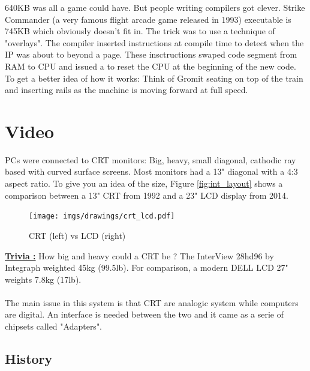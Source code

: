 \documentclass[book.tex]{subfiles}
\begin{document}
\par
{} 640KB was all a game could have. But people writing compilers got clever. Strike Commander (a very famous flight arcade game released in 1993) executable is 745KB which obviously doesn't fit in. The trick was to use a technique of "overlays". The compiler inserted instructions at compile time to detect when the IP was about to beyond a page. These insctructions swaped code segment from RAM to CPU and issued a  to reset the CPU at the beginning of the new code. To get a better idea of how it works: Think of Gromit seating on top of the train and inserting rails as the machine is moving forward at full speed.

















\section{Video}

PCs were connected to CRT monitors: Big, heavy, small diagonal, cathodic ray based with curved surface screens. Most monitors had a 13" diagonal with a 4:3 aspect ratio. To give you an idea of the size, Figure \ref{fig:int_layout} shows a comparison between a 13" CRT from 1992 and a 23" LCD display from 2014.\\

\begin{figure}[H]
\centering
\texttt{[image: imgs/drawings/crt\_lcd.pdf]}
\caption{CRT (left) vs LCD (right)}
\label{fig:lcd_vs_crt}
\end{figure}

\textbf{\underline{Trivia :}} How big and heavy could a CRT be ? The InterView 28hd96 by Integraph weighted 45kg (99.5lb). For comparison, a modern DELL LCD 27" weights 7.8kg (17lb).\\
\\
The main issue in this system is that CRT are analogic system while computers are digital. An interface is needed between the two and it came as a serie of chipsets called "Adapters". 

  \subsection{History}
\end{document}

